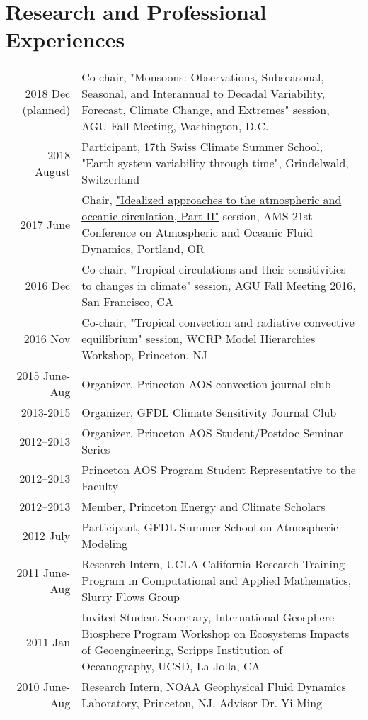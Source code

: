 \documentclass[12pt,letterpaper]{shillcv}
\begin{document}
\section*{Research and Professional Experiences}
\label{sec:org8ab0b85}
\begin{center}
\begin{tabularx}{\textwidth}{rX}
2018 Dec (planned) & Co-chair, "Monsoons: Observations, Subseasonal, Seasonal, and Interannual to Decadal Variability, Forecast, Climate Change, and Extremes" session, AGU Fall Meeting, Washington, D.C.\\
2018 August & Participant, 17th Swiss Climate Summer School, "Earth system variability through time", Grindelwald, Switzerland\\
2017 June & Chair, \href{https://ams.confex.com/ams/21Fluid19Middle/webprogram/Session43327.html}{"Idealized approaches to the atmospheric and oceanic circulation, Part II"} session, AMS 21st Conference on Atmospheric and Oceanic Fluid Dynamics, Portland, OR\\
2016 Dec & Co-chair, "Tropical circulations and their sensitivities to changes in climate" session, AGU Fall Meeting 2016, San Francisco, CA\\
2016 Nov & Co-chair, "Tropical convection and radiative convective equilibrium" session, WCRP Model Hierarchies Workshop, Princeton, NJ\\
2015 June-Aug & Organizer, Princeton AOS convection journal club\\
2013-2015 & Organizer, GFDL Climate Sensitivity Journal Club\\
2012–2013 & Organizer, Princeton AOS Student/Postdoc Seminar Series\\
2012–2013 & Princeton AOS Program Student Representative to the Faculty\\
2012–2013 & Member, Princeton Energy and Climate Scholars\\
2012 July & Participant, GFDL Summer School on Atmospheric Modeling\\
2011 June-Aug & Research Intern, UCLA California Research Training Program in Computational and Applied Mathematics, Slurry Flows Group\\
2011 Jan & Invited Student Secretary, International Geosphere-Biosphere Program Workshop on Ecosystems Impacts of Geoengineering, Scripps Institution of Oceanography, UCSD, La Jolla, CA\\
2010 June-Aug & Research Intern, NOAA Geophysical Fluid Dynamics Laboratory, Princeton, NJ. Advisor Dr. Yi Ming\\
\end{tabularx}
\end{center}
\end{document}
